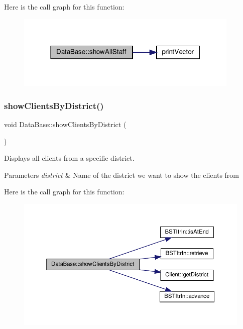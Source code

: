 Here is the call graph for this function\+:\nopagebreak
\begin{figure}[H]
\begin{center}
\leavevmode
\includegraphics[width=302pt]{classDataBase_aa1d2ae05f581ec45eb8da06e468aec30_cgraph}
\end{center}
\end{figure}
\mbox{\label{classDataBase_a2016794a78b86df19676ea9aba3114bc}} 
\subsubsection{\texorpdfstring{show\+Clients\+By\+District()}{showClientsByDistrict()}}
{\footnotesize\ttfamily void Data\+Base\+::show\+Clients\+By\+District (\begin{DoxyParamCaption}{ }\end{DoxyParamCaption})}



Displays all clients from a specific district. 


\begin{DoxyParams}{Parameters}
{\em district} & Name of the district we want to show the clients from \\
\hline
\end{DoxyParams}
Here is the call graph for this function\+:\nopagebreak
\begin{figure}[H]
\begin{center}
\leavevmode
\includegraphics[width=350pt]{classDataBase_a2016794a78b86df19676ea9aba3114bc_cgraph}
\end{center}
\end{figure}
\mbox{\label{classDataBase_ab87e9a50f26c934790774b0bf0d62a51}} 
